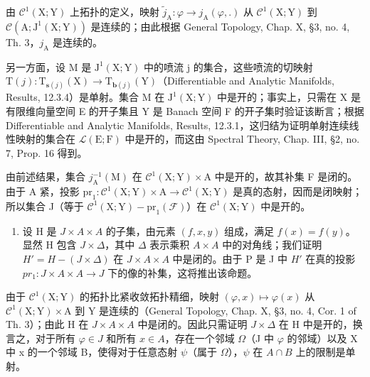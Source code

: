 由 \(\mathcal{C}^1 (\mathrm{X};\mathrm{Y})\) 上拓扑的定义，映射 \(\tilde{j}_{\mathrm{A}}:\varphi \to j_{\mathrm{A}}(\varphi ,.)\) 从 \(\mathcal{C}^1 (\mathrm{X};\mathrm{Y})\) 到 \(\mathcal{C}(\mathrm{A};\mathrm{J}^1 (\mathrm{X};\mathrm{Y}))\) 是连续的；由此根据 General Topology, Chap. X, §3, no. 4, Th. 3，\(j_{\mathrm{A}}\) 是连续的。

另一方面，设 M 是 \(\mathrm{J}^{1}(\mathrm{X};\mathrm{Y})\) 中的喷流 j 的集合，这些喷流的切映射 \(\mathrm{T}(j):\mathrm{T}_{\mathbf{s}(j)}(\mathrm{X})\to\mathrm{T}_{\mathbf{b}(j)}(\mathrm{Y})\)（Differentiable and Analytic Manifolds, Results, 12.3.4）是单射。集合 M 在 \(\mathrm{J}^{1}(\mathrm{X};\mathrm{Y})\) 中是开的；事实上，只需在 X 是有限维向量空间 E 的开子集且 Y 是 Banach 空间 F 的开子集时验证该断言；根据 Differentiable and Analytic Manifolds, Results, 12.3.1，这归结为证明单射连续线性映射的集合在 \(\mathcal{L}(\mathrm{E};\mathrm{F})\) 中是开的，而这由 Spectral Theory, Chap. III, §2, no. 7, Prop. 16 得到。

由前述结果，集合 \(j_{\mathrm{A}}^{-1}(\mathrm{M})\) 在 \(\mathcal{C}^{1}(\mathrm{X};\mathrm{Y})\times\mathrm{A}\) 中是开的，故其补集 F 是闭的。由于 A 紧，投影 \(\mathrm{pr}_{1}:\mathcal{C}^{1}(\mathrm{X};\mathrm{Y})\times\mathrm{A}\to\mathcal{C}^{1}(\mathrm{X};\mathrm{Y})\) 是真的态射，因而是闭映射；所以集合 J（等于 \(\mathcal{C}^{1}(\mathrm{X};\mathrm{Y})-\mathrm{pr}_{1}(\mathcal{F})\)）在 \(\mathcal{C}^{1}(\mathrm{X};\mathrm{Y})\) 中是开的。

\begin{enumerate}
\def\labelenumi{\alph{enumi})}
\setcounter{enumi}{1}
\tightlist
\item
  设 H 是 \(J \times A \times A\) 的子集，由元素 \((f, x, y)\) 组成，满足 \(f(x) = f(y)\)。显然 H 包含 \(J \times \Delta\)，其中 \(\Delta\) 表示乘积 \(A \times A\) 中的对角线；我们证明 \(H' = H - (J \times \Delta)\) 在 \(J \times A \times A\) 中是闭的。由于 P 是 J 中 \(H'\) 在真的投影 \(pr_{1}: J \times A \times A \to J\) 下的像的补集，这将推出该命题。
\end{enumerate}

由于 \(\mathcal{C}^{1}(\mathrm{X};\mathrm{Y})\) 的拓扑比紧收敛拓扑精细，映射 \((\varphi,x)\mapsto\varphi(x)\) 从 \(\mathcal{C}^{1}(\mathrm{X};\mathrm{Y})\times\mathrm{A}\) 到 Y 是连续的（General Topology, Chap. X, §3, no. 4, Cor. 1 of Th. 3）；由此 H 在 \(J\times A\times A\) 中是闭的。因此只需证明 \(J\times\Delta\) 在 H 中是开的，换言之，对于所有 \(\varphi\in J\) 和所有 \(x\in A\)，存在一个邻域 \(\Omega\)（J 中 \(\varphi\) 的邻域）以及 X 中 x 的一个邻域 B，使得对于任意态射 \(\psi\)（属于 \(\Omega\)），\(\psi\) 在 \(A\cap B\) 上的限制是单射。


